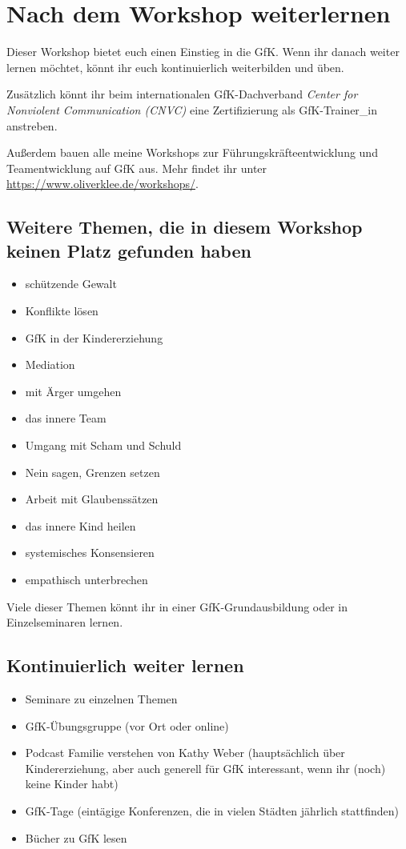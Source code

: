 \section{Nach dem Workshop weiterlernen}
\label{gfk-weiterlenen}

Dieser Workshop bietet euch einen Einstieg in die GfK. Wenn ihr danach weiter lernen möchtet, könnt ihr euch kontinuierlich weiterbilden und üben.

Zusätzlich könnt ihr beim internationalen GfK-Dachverband \emph{Center for Nonviolent Communication (CNVC)} eine Zertifizierung als GfK-Trainer\_in anstreben.

Außerdem bauen alle meine Workshops zur Führungskräfteentwicklung und Teamentwicklung auf GfK aus. Mehr findet ihr unter \url{https://www.oliverklee.de/workshops/}.


\subsection{Weitere Themen, die in diesem Workshop keinen Platz gefunden haben}

\begin{itemize}
  \item schützende Gewalt
  \item Konflikte lösen
  \item GfK in der Kindererziehung
  \item Mediation
  \item mit Ärger umgehen
  \item das innere Team
  \item Umgang mit Scham und Schuld
  \item Nein sagen, Grenzen setzen
  \item Arbeit mit Glaubenssätzen
  \item das innere Kind heilen
  \item systemisches Konsensieren
  \item empathisch unterbrechen
\end{itemize}

Viele dieser Themen könnt ihr in einer GfK-Grundausbildung oder in Einzelseminaren lernen.


\subsection{Kontinuierlich weiter lernen}

\begin{itemize}
  \item Seminare zu einzelnen Themen
  \item GfK-Übungsgruppe (vor Ort oder online)
  \item Podcast \glqq Familie verstehen\grqq\cite{familie-verstehen-podcast} von Kathy Weber (hauptsächlich über Kindererziehung, aber auch generell für GfK interessant, wenn ihr (noch) keine Kinder habt)
  \item GfK-Tage (eintägige Konferenzen, die in vielen Städten jährlich stattfinden)
  \item Bücher zu GfK lesen
\end{itemize}

